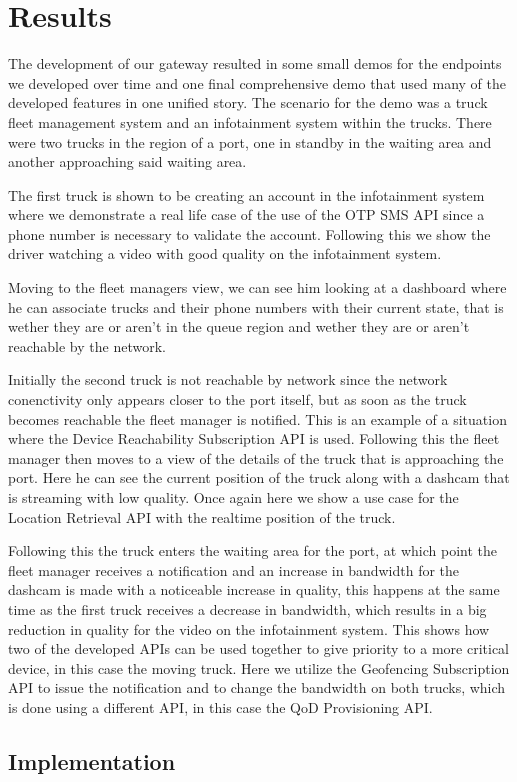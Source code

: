 \chapter{Results}

The development of our gateway resulted in some small demos for the endpoints
we developed over time and one final comprehensive demo that used many of the
developed features in one unified story. The scenario for the demo was a truck
fleet management system and an infotainment system within the trucks. There
were two trucks in the region of a port, one in standby in the waiting area and
another approaching said waiting area.

The first truck is shown to be creating an account in the infotainment system
where we demonstrate a real life case of the use of the OTP SMS API since a
phone number is necessary to validate the account. Following this we show the
driver watching a video with good quality on the infotainment system.

Moving to the fleet managers view, we can see him looking at a dashboard where
he can associate trucks and their phone numbers with their current state, that
is wether they are or aren't in the queue region and wether they are or aren't
reachable by the network.

Initially the second truck is not reachable by network since the network
conenctivity only appears closer to the port itself, but as soon as the truck
becomes reachable the fleet manager is notified. This is an example of a
situation where the Device Reachability Subscription API is used. Following
this the fleet manager then moves to a view of the details of the truck that is
approaching the port. Here he can see the current position of the truck along
with a dashcam that is streaming with low quality. Once again here we show a
use case for the Location Retrieval API with the realtime position of the
truck.

Following this the truck enters the waiting area for the port, at which point
the fleet manager receives a notification and an increase in bandwidth for the
dashcam is made with a noticeable increase in quality, this happens at the same
time as the first truck receives a decrease in bandwidth, which results in a
big reduction in quality for the video on the infotainment system. This shows
how two of the developed APIs can be used together to give priority to a more
critical device, in this case the moving truck. Here we utilize the Geofencing
Subscription API to issue the notification and to change the bandwidth on both
trucks, which is done using a different API, in this case the QoD Provisioning
API.

\section{Implementation}
